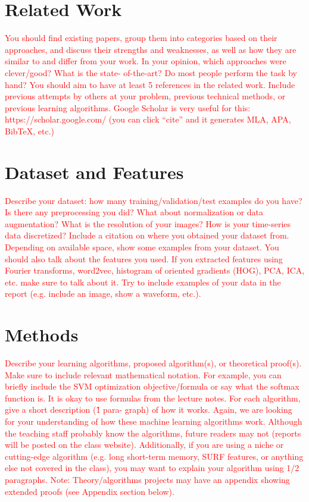 \documentclass{article}
\begin{document}
\section{Related Work}
\textcolor{red}{
You should find existing papers, group them into categories based on their approaches, and discuss their strengths and weaknesses, as well as how they are similar to and differ from your work. In your opinion, which approaches were clever/good? What is the state- of-the-art? Do most people perform the task by hand? You should aim to have at least 5 references in the related work. Include previous attempts by others at your problem, previous technical methods, or previous learning algorithms. Google Scholar is very useful for this: https://scholar.google.com/ (you can click “cite” and it generates MLA, APA, BibTeX, etc.)
}

\section{Dataset and Features}
\textcolor{red}{
Describe your dataset: how many training/validation/test examples do you have? Is there any preprocessing you did? What about normalization or data augmentation? What is the resolution of your images? How is your time-series data discretized? Include a citation on where you obtained your dataset from. Depending on available space, show some examples from your dataset. You should also talk about the features you used. If you extracted features using Fourier transforms, word2vec, histogram of oriented gradients (HOG), PCA, ICA, etc. make sure to talk about it. Try to include examples of your data in the report (e.g. include an image, show a waveform, etc.).
}

\section{Methods}
\textcolor{red}{
Describe your learning algorithms, proposed algorithm(s), or theoretical proof(s). Make sure to include relevant mathematical notation. For example, you can briefly include the SVM optimization objective/formula or say what the softmax function is. It is okay to use formulas from the lecture notes. For each algorithm, give a short description (\~ 1 para- graph) of how it works. Again, we are looking for your understanding of how these machine learning algorithms work. Although the teaching staff probably know the algorithms, future readers may not (reports will be posted on the class website). Additionally, if you are using a niche or cutting-edge algorithm (e.g. long short-term memory, SURF features, or anything else not covered in the class), you may want to explain your algorithm using 1/2 paragraphs. Note: Theory/algorithms projects may have an appendix showing extended proofs (see Appendix section below).
}
\end{document}
